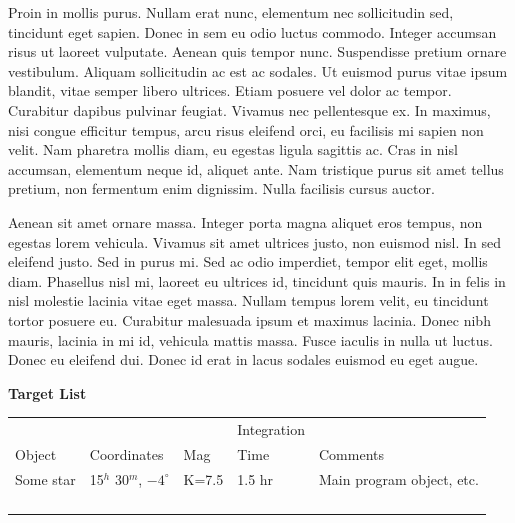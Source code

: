 \documentclass{lowell-prop}
\begin{document}
%
% 
\techJustification 

Proin in mollis purus. Nullam erat nunc, elementum nec sollicitudin sed, tincidunt eget sapien. Donec in sem eu odio luctus commodo. Integer accumsan risus ut laoreet vulputate. Aenean quis tempor nunc. Suspendisse pretium ornare vestibulum. Aliquam sollicitudin ac est ac sodales. Ut euismod purus vitae ipsum blandit, vitae semper libero ultrices. Etiam posuere vel dolor ac tempor. Curabitur dapibus pulvinar feugiat. Vivamus nec pellentesque ex. In maximus, nisi congue efficitur tempus, arcu risus eleifend orci, eu facilisis mi sapien non velit. Nam pharetra mollis diam, eu egestas ligula sagittis ac. Cras in nisl accumsan, elementum neque id, aliquet ante. Nam tristique purus sit amet tellus pretium, non fermentum enim dignissim. Nulla facilisis cursus auctor.

Aenean sit amet ornare massa. Integer porta magna aliquet eros tempus, non egestas lorem vehicula. Vivamus sit amet ultrices justo, non euismod nisl. In sed eleifend justo. Sed in purus mi. Sed ac odio imperdiet, tempor elit eget, mollis diam. Phasellus nisl mi, laoreet eu ultrices id, tincidunt quis mauris. In in felis in nisl molestie lacinia vitae eget massa. Nullam tempus lorem velit, eu tincidunt tortor posuere eu. Curabitur malesuada ipsum et maximus lacinia. Donec nibh mauris, lacinia in mi id, vehicula mattis massa. Fusce iaculis in nulla ut luctus. Donec eu eleifend dui. Donec id erat in lacus sodales euismod eu eget augue.

\clearpage



\begin{center}
{\bf Target List} \\[2em]
\begin{tabular}{l l l l l} 
\hline\hline 
&   &   &Integration&  \\
Object & Coordinates & Mag & Time & Comments \\ [0.5ex] 
\hline 
Some star & 15$^h$ 30$^m$, $-4^{\circ}$ & K=7.5 & 1.5 hr & Main program object, etc. \\
   &   &   &   & \\
   &   &   &   & \\
   &   &   &   & \\
   &   &   &   & \\  [1ex] 
\hline 
\end{tabular}
\end{center}
\end{document}
